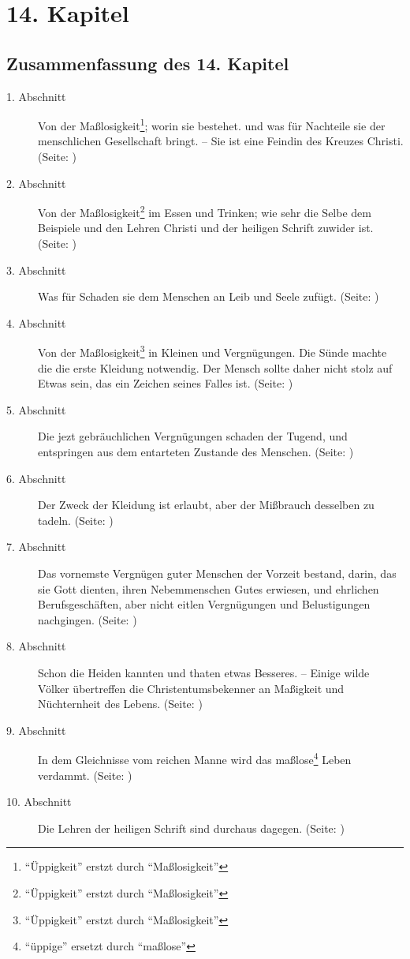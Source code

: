 

\chapter{14. Kapitel} \label{kap14}

\section{Zusammenfassung des 14. Kapitel}
\small
\begin{description}
\item[1. Abschnitt] Von der Maßlosigkeit\footnote{"`Üppigkeit"' erstzt durch "`Maßlosigkeit"'}; worin sie bestehet. und was für Nachteile
sie der menschlichen Gesellschaft bringt. -- Sie ist eine Feindin des Kreuzes
Christi. (Seite: \pageref{kap14_ab1})
\item[2. Abschnitt] Von der Maßlosigkeit\footnote{"`Üppigkeit"' erstzt durch "`Maßlosigkeit"'} im Essen und Trinken; wie sehr die Selbe
dem Beispiele und den Lehren Christi und der heiligen Schrift zuwider ist. (Seite: \pageref{kap14_ab2})
\item[3. Abschnitt] Was für Schaden sie dem Menschen an Leib und Seele zufügt. (Seite: \pageref{kap14_ab3})
\item[4. Abschnitt] Von der Maßlosigkeit\footnote{"`Üppigkeit"' erstzt durch "`Maßlosigkeit"'} in Kleinen und Vergnügungen. Die Sünde
machte die die erste Kleidung notwendig. Der Mensch sollte daher nicht stolz auf
Etwas sein, das ein Zeichen seines Falles ist. (Seite: \pageref{kap14_ab4})
\item[5. Abschnitt] Die jezt gebräuchlichen Vergnügungen schaden der Tugend, und
entspringen aus dem entarteten Zustande des Menschen. (Seite: \pageref{kap14_ab5})
\item[6. Abschnitt] Der Zweck der Kleidung ist erlaubt, aber der Mißbrauch
desselben zu tadeln. (Seite: \pageref{kap14_ab6})
\item[7. Abschnitt] Das vornemste Vergnügen guter Menschen der Vorzeit bestand,
darin, das sie Gott dienten, ihren Nebemmenschen Gutes erwiesen, und ehrlichen
Berufsgeschäften, aber nicht eitlen Vergnügungen und Belustigungen nachgingen. (Seite: \pageref{kap14_ab7})
\item[8. Abschnitt] Schon die Heiden kannten und thaten etwas Besseres. --
Einige wilde Völker übertreffen die Christentumsbekenner an Maßigkeit und
Nüchternheit des Lebens. (Seite: \pageref{kap14_ab8})
\item[9. Abschnitt] In dem Gleichnisse vom reichen Manne wird das maßlose\footnote{"`üppige"' ersetzt durch "`maßlose"'} Leben
verdammt. (Seite: \pageref{kap14_ab9})
\item[10. Abschnitt] Die Lehren der heiligen Schrift sind durchaus dagegen. (Seite: \pageref{kap14_ab10})
\end{description}
\normalsize

